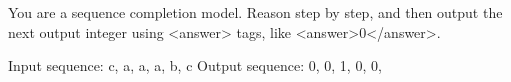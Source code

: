 You are a sequence completion model. Reason step by step, and then output the next output integer using <answer> tags, like <answer>0</answer>.

Input sequence: c, a, a, a, b, c
Output sequence: 0, 0, 1, 0, 0, 
